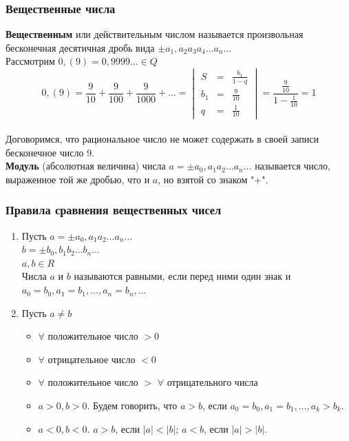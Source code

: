 \documentclass[12pt]{article}
\begin{document}
    \subsubsection*{Вещественные числа}
    \noindent \textbf{Вещественным} или действительным числом называется произвольная бесконечная десятичная дробь вида $\pm a_{1},a_{2}a_{3}a_{4}\dots a_{n} \dots$\\
    Рассмотрим $0,(9) = 0,9999\dots \in Q$\\
    \[0,(9) = \frac{9}{10} + \frac{9}{100} + \frac{9}{1000} + \dots = \begin{vmatrix}
        S & = & \frac{b_{1}}{1-q}\\
        b_{1} & = & \frac{9}{10}\\
        q & = & \frac{1}{10}
    \end{vmatrix} = \frac{\frac{9}{10}}{1-\frac{1}{10}} = 1\]\\
    Договоримся, что рациональное число не может содержать в своей записи бесконечное число 9.\\
    \textbf{Модуль} (абсолютная величина) числа $a = \pm a_{0},a_{1}a_{2}\dots a_{n}\dots$ называется число, выраженное той же дробью, что и $a$, но взятой со знаком "+".
    \subsubsection*{Правила сравнения вещественных чисел}
    \begin{enumerate}
        \item Пусть $a = \pm a_{0},a_{1}a_{2}\dots a_{n}\dots$\\
        $b = \pm b_{0},b_{1}b_{2}\dots b_{n}\dots$\\
        $a,b \in R$\\
        Числа $a$ и $b$ называются равными, если перед ними один знак и $a_{0} = b_{0}, a_{1} = b_{1}, \dots, a_{n} = b_{n}, \dots$
        \item Пусть $a \ne b$
        \begin{itemize}
            \item $\forall$ положительное число $> 0$
            \item $\forall$ отрицательное число $< 0$
            \item $\forall$ положительное число $>$ $\forall$ отрицательного числа
            \item $a > 0, b > 0$. Будем говорить, что $a > b$, если $a_{0}=b_{0}, a_{1}=b_{1},\dots,a_{k}>b_{k}$.
            \item $a < 0, b < 0$. $a > b$, если $|a| < |b|$; $a < b$, если $|a| > |b|$.
        \end{itemize}
    \end{enumerate}
\end{document}
